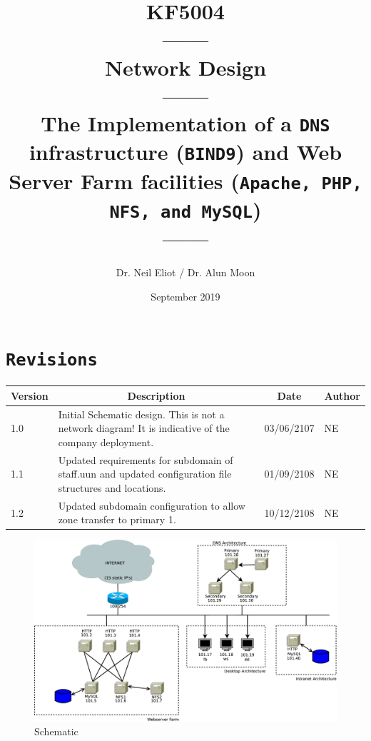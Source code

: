 \documentclass[11pt]{article}
\begin{document}
\author{Dr. Neil Eliot / Dr. Alun Moon}
\title{KF5004\\------\\Network Design\\------\\The Implementation of a \texttt{DNS} infrastructure (\texttt{BIND9}) and Web Server Farm facilities
(\texttt{Apache, PHP, NFS, and MySQL})\\------}
\date{September 2019}
\maketitle

\newpage
\tableofcontents
\newpage

\section{\texttt{Revisions}}
\begin{table}[ht]
    \begin{tabular}{|p{1.5cm}|p{11cm}|p{2cm}|p{1.5cm}|} 
      \hline
      \multicolumn{1}{|c|}{Version} & \multicolumn{1}{|c|}{Description} & \multicolumn{1}{|c|}{Date}& \multicolumn{1}{|c|}{Author} \\ 
      \hline
      1.0 & Initial Schematic design. This is not a network diagram! It is indicative of the company deployment.& 03/06/2107 & NE\\
      \hline
      1.1 & Updated requirements for subdomain of staff.uun and updated configuration file structures and locations.& 01/09/2108 & NE\\
      \hline
      1.2 & Updated subdomain configuration to allow zone transfer to primary 1.& 10/12/2108 & NE\\
      \hline
    \end{tabular}
\end{table}
\newpage

\begin{landscape}
        \begin{figure}
        \begin{center}
            \includegraphics[width=1\linewidth]{Schematic.png}
            \caption{Schematic}
        \end{center}
      \end{figure}
\end{landscape}
\end{document}
